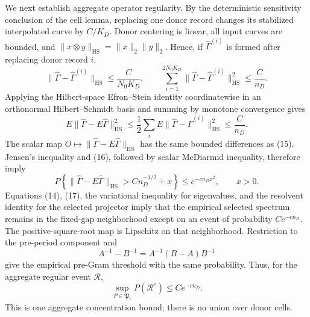 We next establish aggregate operator regularity.  By the deterministic
sensitivity conclusion of the cell lemma, replacing one donor record changes
its stabilized interpolated curve by \(C/K_D\).  Donor centering is linear,
all input curves are bounded, and
\(\|x\otimes y\|_{\mathrm{HS}}=\|x\|_2\|y\|_2\).  Hence, if
\(\widehat\Gamma^{(i)}\) is formed after replacing donor record \(i\),
\[
 \|\widehat\Gamma-\widehat\Gamma^{(i)}\|_{\mathrm{HS}}
 \leq\frac{C}{N_0K_D},
 \qquad
 \sum_{i=1}^{2N_0K_D}
 \|\widehat\Gamma-\widehat\Gamma^{(i)}\|_{\mathrm{HS}}^2
 \leq\frac{C}{n_D}.                                     \tag{15}
\]
Applying the Hilbert-space Efron--Stein identity coordinatewise in an
orthonormal Hilbert--Schmidt basis and summing by monotone convergence gives
\[
 E\|\widehat\Gamma-E\widehat\Gamma\|_{\mathrm{HS}}^2
 \leq\frac12\sum_iE
 \|\widehat\Gamma-\widehat\Gamma^{(i)}\|_{\mathrm{HS}}^2
 \leq\frac{C}{n_D}.                                     \tag{16}
\]
The scalar map
\(O\mapsto\|\widehat\Gamma-E\widehat\Gamma\|_{\mathrm{HS}}\) has the
same bounded differences as (15).  Jensen's inequality and (16), followed by
scalar McDiarmid inequality, therefore imply
\[
 P\left\{\|\widehat\Gamma-E\widehat\Gamma\|_{\mathrm{HS}}
 >Cn_D^{-1/2}+x\right\}
 \leq e^{-cn_Dx^2},
 \qquad x>0.                                             \tag{17}
\]
Equations (14), (17), the variational inequality for eigenvalues, and the
resolvent identity for the selected projector imply that the empirical
selected spectrum remains in the fixed-gap neighborhood except on an event
of probability \(Ce^{-cn_D}\).  The positive-square-root map is Lipschitz on
that neighborhood.  Restriction to the pre-period component and
\[
 A^{-1}-B^{-1}=A^{-1}(B-A)B^{-1}                          \tag{18}
\]
give the empirical pre-Gram threshold with the same probability.  Thus, for
the aggregate regular event \(\mathcal R\),
\[
 \sup_{P\in\mathfrak P_r}P(\mathcal R^c)\leq Ce^{-cn_D}. \tag{19}
\]
This is one aggregate concentration bound; there is no union over donor cells.

